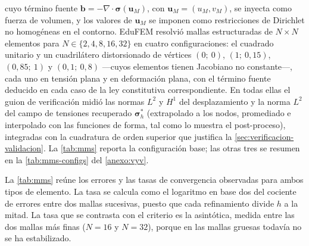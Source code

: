 cuyo término fuente $\bm{b} = -\nabla\cdot\bm{\sigma}(\bm{u}_M)$, con $\bm{u}_M = (u_M, v_M)$, se inyecta como fuerza de volumen, y los valores de $\bm{u}_M$ se imponen como restricciones de Dirichlet no homogéneas en el contorno. EduFEM resolvió mallas estructuradas de $N\times N$ elementos para $N\in\{2,4,8,16,32\}$ en cuatro configuraciones: el cuadrado unitario y un cuadrilátero distorsionado de vértices $(0;\ 0)$, $(1;\ 0{,}15)$, $(0{,}85;\ 1)$ y $(0{,}1;\ 0{,}8)$ —cuyos elementos tienen Jacobiano no constante—, cada uno en tensión plana y en deformación plana, con el término fuente deducido en cada caso de la ley constitutiva correspondiente. En todas ellas el guion de verificación midió las normas $L^2$ y $H^1$ del desplazamiento y la norma $L^2$ del campo de tensiones recuperado $\bm{\sigma}^*_h$ (extrapolado a los nodos, promediado e interpolado con las funciones de forma, tal como lo muestra el post-proceso), integradas con la cuadratura de orden superior que justifica la \autoref{sec:verificacion-validacion}. La \autoref{tab:mms} reporta la configuración base; las otras tres se resumen en la \autoref{tab:mms-configs} del \autoref{anexo:vyv}.

La \autoref{tab:mms} reúne los errores y las tasas de convergencia observadas para ambos tipos de elemento. La tasa se calcula como el logaritmo en base dos del cociente de errores entre dos mallas sucesivas, puesto que cada refinamiento divide $h$ a la mitad. La tasa que se contrasta con el criterio es la asintótica, medida entre las dos mallas más finas ($N=16$ y $N=32$), porque en las mallas gruesas todavía no se ha estabilizado.

